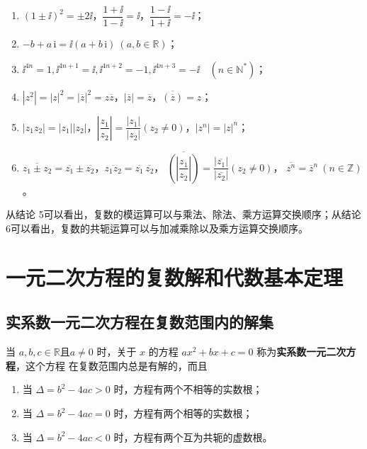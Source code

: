 \documentclass[a4paper,openany]{ctexbook}
\begin{document}
\begin{enumerate}
    \item \((1 \pm \ii)^2=\pm 2 \ii\)，\(\dfrac{1+\ii}{1-\ii}=\ii\)，\(\dfrac{1-\ii}{1+\ii}=-\ii\)；
    \item \(-b+a\,\mathrm{i}=\ii(a+b\,\mathrm{i}) \ (a,b \in \mathbb{R} )\)；
    \item \(\ii^{4n}=1,\ii^{4n+1}=\ii,\ii^{4n+2}=-1,\ii^{4n+3}=-\ii \quad (n \in \mathbb{N} ^*)\)；
    \item \(|z^2|=|z|^2=|\overline{z}|^2=z \overline{z}\)，\(\left|\overline{z}\right|=\overline{z}\)，\(\overline{(\overline{z})}=z\)；
    \item \(|z_1z_2|=|z_1||z_2|\)，\(\left|\dfrac{z_1}{z_2}\right|=\dfrac{|z_1|}{|z_2|}(z_2 \ne 0)\)，\(|z^n|=|z|^n\)；
    \item \(\overline{z_1 \pm z_2}=\overline{z_1}\pm \overline{z_2}\)，\(\overline{z_1z_2}=\overline{z_1}\, \overline{z_2}\)，
          \(\overline{\left(\left|\dfrac{z_1}{z_2}\right|\right)}=\dfrac{|\overline{z_1}|}{|\overline{z_2}|}(z_2 \ne 0)\)，
          \(\overline{z^n}=\overline{z}^n\ (n \in \mathbb{Z} )\)。
\end{enumerate}

从结论 5可以看出，复数的模运算可以与乘法、除法、乘方运算交换顺序；从结论6可以看出，复数的共轭运算可以与加减乘除以及乘方运算交换顺序。

\section{一元二次方程的复数解和代数基本定理}

\subsection{实系数一元二次方程在复数范围内的解集}

当 \(a,b,c\in \mathbb{R}\text{且}a\ne 0\) 时，关于 \(x\) 的方程 \(ax^2+bx+c=0\) 称为\textbf{实系数一元二次方程}，这个方程
在复数范围内总是有解的，而且
\begin{enumerate}
    \item 当 \(\varDelta=b^2-4ac>0\) 时，方程有两个不相等的实数根；
    \item 当 \(\varDelta=b^2-4ac=0\) 时，方程有两个相等的实数根；
    \item 当 \(\varDelta=b^2-4ac<0\) 时，方程有两个互为共轭的虚数根。
\end{enumerate}
\end{document}
